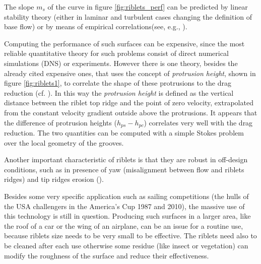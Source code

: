 The slope $m_s$ of the curve in figure \ref{fig:riblets_perf} can be predicted by linear stability theory (either in laminar and turbulent cases changing the definition of base flow) or by means of empirical correlations(see, e.g., \citet{garcia2011hydrodynamic}).

Computing the performance of such surfaces can be expensive, since the most reliable quantitative theory for such problems consist of direct numerical simulations (DNS) or experiments.
However there is one theory, besides the already cited expensive ones, that uses the concept of \textit{protrusion height}, shown in figure \ref{fig:riblets1}, to correlate the shape of these protrusions to the drag reduction (cf. \citet{luchini1991resistance}).
In this way the \textit{protrusion height} is defined as the vertical distance between the riblet top ridge and the point of zero velocity, extrapolated from the constant velocity gradient outside above the protrusions.
It appears that the difference of protrusion heights ($h_{ps} - h_{pc}$) correlates very well with the drag reduction. The two quantities can be computed with a simple Stokes problem over the local geometry of the grooves.
%
%

Another important characteristic of riblets is that they are robust in off-design conditions, such as in presence of yaw (misalignment between flow and riblets ridges) and tip ridges erosion (\citet{garcia2011drag}).

Besides some very specific application such as sailing competitions (the hulls of the USA challengers in the America’s Cup 1987 and 2010), the massive use of this technology is still in question.
Producing such surfaces in a larger area, like the roof of a car or the wing of an airplane, can be an issue for a routine use, because riblets size needs to be very small to be effective. The riblets need also to be cleaned after each use otherwise some residue (like insect or vegetation) can modify the roughness of the surface and reduce their effectiveness.

